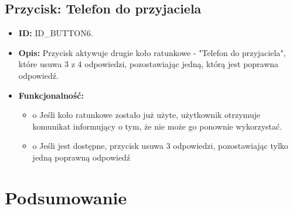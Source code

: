\documentclass[]{article}
\begin{document}
	\subsection{Przycisk: Telefon do przyjaciela}
	\begin{itemize}
		\item \textbf{ID:} ID\_BUTTON6.
		\item \textbf{Opis:} Przycisk aktywuje drugie koło ratunkowe - "Telefon do przyjaciela", które  usuwa 3 z 4 odpowiedzi, pozostawiając jedną, którą jest poprawna odpowiedź.
		\item \textbf{Funkcjonalność:}
		\begin{itemize}
			\item o	Jeśli koło ratunkowe zostało już użyte, użytkownik otrzymuje komunikat informujący o tym, że nie może go ponownie wykorzystać.
			\item o	Jeśli jest dostępne, przycisk usuwa 3 odpowiedzi, pozostawiając tylko jedną poprawną odpowiedź
		\end{itemize}
	\end{itemize}
	
	
	\section{Podsumowanie}
	
\end{document}
